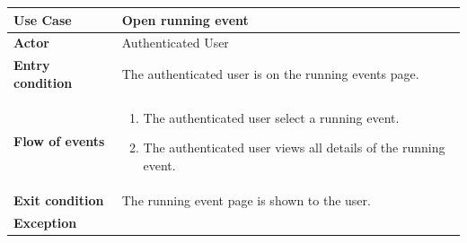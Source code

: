 \documentclass[../main.tex]{subfiles}
\begin{document}
	\vspace*{3cm}
	\begin{center}
		\begin{tabular}{p{3cm}p{8.28cm}}
			\hline
			\textbf{Use Case} & Open running event\\
			\hline
			\textbf{Actor} & Authenticated User\\
			\hline
			\textbf{Entry condition} & The authenticated user is on the running events page.\\
			\hline
			\textbf{Flow of events} & \begin{enumerate}
				\linespread{0}\item The authenticated user select a running event.
				\linespread{0}\item The authenticated user views all details of the running event.
			\end{enumerate}\\
			\hline
			\textbf{Exit condition} & The running event page is shown to the user.\\
			\hline
			\textbf{Exception}\\
			\hline
		\end{tabular}
	\end{center}
	\vspace*{3cm}
\end{document}
